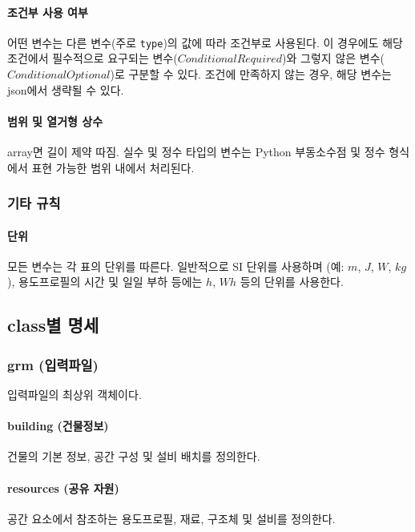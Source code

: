 \paragraph{조건부 사용 여부} 어떤 변수는 다른 변수(주로 \texttt{type})의 값에 따라 조건부로 사용된다. 이 경우에도 해당 조건에서 필수적으로 요구되는 변수($Conditional Required$)와 그렇지 않은 변수($Conditional Optional$)로 구분할 수 있다. 조건에 만족하지 않는 경우, 해당 변수는 json에서 생략될 수 있다.

\paragraph{범위 및 열거형 상수} array면 길이 제약 따짐.
실수 및 정수 타입의 변수는 Python 부동소수점 및 정수 형식에서 표현 가능한 범위 내에서 처리된다.

\subsubsection{기타 규칙}

\paragraph{단위} 모든 변수는 각 표의 단위를 따른다. 일반적으로 SI 단위를 사용하며 (예: $m$, $J$, $W$, $kg$), 용도프로필의 시간 및 일일 부하 등에는 $h$, $Wh$ 등의 단위를 사용한다.

\subsection{class별 명세}

\subsubsection{grm (입력파일)} \label{subsubsection:ioref:grm}
입력파일의 최상위 객체이다.


\paragraph{building (건물정보)} 건물의 기본 정보, 공간 구성 및 설비 배치를 정의한다.

\paragraph{resources (공유 자원)} 공간 요소에서 참조하는 용도프로필, 재료, 구조체 및 설비를 정의한다.

